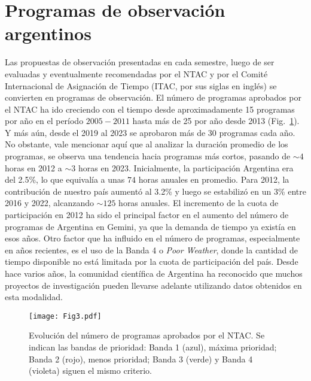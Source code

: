 \documentclass[baaa]{baaa}
\begin{document}
\section{Programas de observación argentinos}
Las propuestas de observación presentadas en cada semestre, luego de ser evaluadas y eventualmente recomendadas por el NTAC y por el Comité Internacional de Asignación de Tiempo (ITAC, por sus siglas en inglés) se convierten en programas de observación. El número de programas aprobados por el NTAC ha ido creciendo con el tiempo desde aproximadamente 15 programas por año en el período $2005-2011$ hasta más de 25 por año desde 2013 (Fig.~\ref{fig3}). Y más aún, desde el 2019 al 2023 se aprobaron más de 30 programas cada año.\\

No obstante, vale mencionar aquí que al analizar la duración promedio de los programas, se observa una tendencia hacia programas más cortos, pasando de $\sim4$ horas en 2012 a $\sim3$ horas en 2023. Inicialmente, la participación Argentina era del 2.5\%, lo que equivalía a unas $74$ horas anuales en promedio. Para 2012, la contribución de nuestro país aumentó al 3.2\% y luego se estabilizó en un 3\% entre 2016 y 2022, alcanzando $\sim 125$ horas anuales. El incremento de la cuota de participación en 2012 ha sido el principal factor en el aumento del número de programas de Argentina en Gemini, ya que la demanda de tiempo ya existía en esos años. Otro factor que ha influido en el número de programas, especialmente en años recientes, es el uso de la Banda 4 o {\it Poor Weather}, donde la cantidad de tiempo disponible no está limitada por la cuota de participación del país. Desde hace varios años, la comunidad científica de Argentina ha reconocido que muchos proyectos de investigación pueden llevarse adelante utilizando datos obtenidos en esta modalidad.\\ 

\begin{figure}[!t]
\centering
\texttt{[image: Fig3.pdf]}
\caption{Evolución del número de programas aprobados por el NTAC. Se indican las bandas de prioridad: Banda 1 (azul),
máxima prioridad; Banda 2 (rojo), menos prioridad; Banda 3 (verde) y Banda 4 (violeta) siguen el mismo criterio.}
\label{fig3}
\end{figure}
\end{document}
